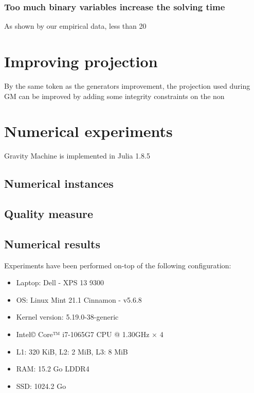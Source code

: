 \subsubsection{Too much binary variables increase the solving time}
As shown by our empirical data, less than 20

\section{Improving projection}
By the same token as the generators improvement, the projection used during GM can be improved by adding some integrity constraints on the non 

\section{Numerical experiments}
Gravity Machine is implemented in Julia 1.8.5 \cite{Julia-2017}
\subsection{Numerical instances}
\subsection{Quality measure}
\subsection{Numerical results}
Experiments have been performed on-top of the following configuration:
\begin{itemize}
    \item Laptop: Dell - XPS 13 9300
    \item OS: Linux Mint 21.1 Cinnamon - v5.6.8
    \item Kernel version: 5.19.0-38-generic
    \item Intel© Core™ i7-1065G7 CPU @ 1.30GHz × 4
    \item L1: 320 KiB, L2: 2 MiB, L3: 8 MiB
    \item RAM: 15.2 Go LDDR4
    \item SSD: 1024.2 Go
\end{itemize}
\subsubsection{}